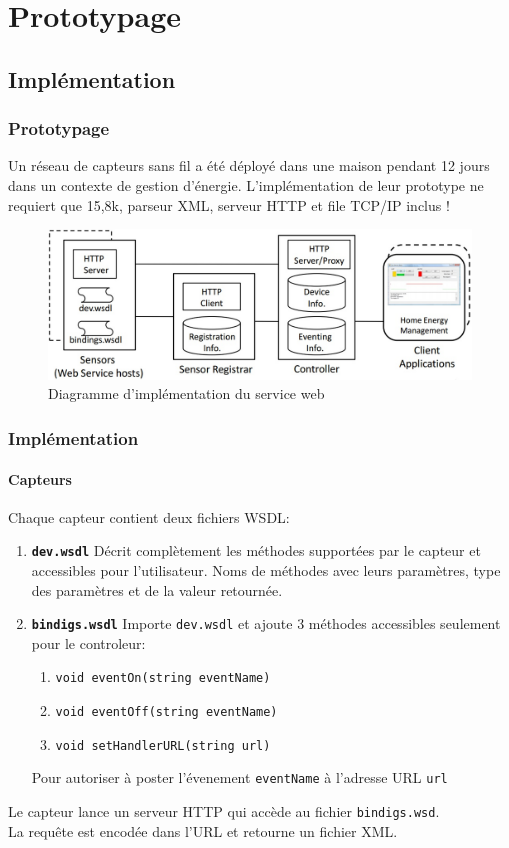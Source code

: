 \section{Prototypage}
\subsection{Implémentation}
\begin{frame}
 \frametitle{Prototypage}
 Un réseau de capteurs sans fil a été déployé dans une maison pendant 12 jours dans un contexte de gestion d'énergie.
 L'implémentation de leur prototype ne requiert \alert{que 15,8k}, parseur XML, serveur HTTP et file TCP/IP inclus !
 \begin{figure}
  \centering
  \includegraphics[scale=0.36]{figures/implementation.jpg}
  \caption{Diagramme d'implémentation du service web}
 \end{figure} 
\end{frame}

\begin{frame}
 \frametitle{Implémentation}
 \framesubtitle{Capteurs}
 Chaque capteur contient deux fichiers WSDL:
 \begin{enumerate}
  \item \textbf{\texttt{dev.wsdl}} Décrit complètement les méthodes supportées par le capteur et accessibles pour l'utilisateur. Noms de méthodes avec leurs paramètres, type des paramètres et de la valeur retournée.
  \item \textbf{\texttt{bindigs.wsdl}} Importe \texttt{dev.wsdl} et ajoute 3 méthodes accessibles seulement pour le controleur:
   \begin{enumerate}
    \item \texttt{void eventOn(string eventName)}
    \item \texttt{void eventOff(string eventName)}
    \item \texttt{void setHandlerURL(string url)}
   \end{enumerate}
   Pour autoriser à poster l'évenement \texttt{eventName} à l'adresse URL \texttt{url}
 \end{enumerate}
 Le capteur lance un serveur HTTP qui accède au fichier \texttt{bindigs.wsd}.\\
 La requête est encodée dans l'URL et retourne un fichier XML.
\end{frame}


